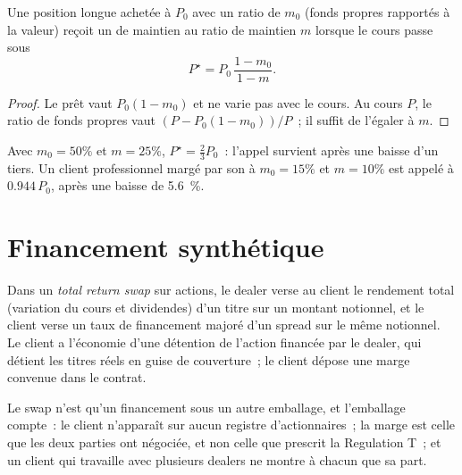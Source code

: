 \begin{proposition}\label{prop:m1:financing:call}
Une position longue achetée à $P_0$ avec un ratio de  $m_0$ (fonds propres
rapportés à la valeur) reçoit un  de maintien au ratio de maintien $m$ lorsque le cours
passe sous
\[
P^\star = P_0\,\frac{1-m_0}{1-m}.
\]
\end{proposition}
\begin{proof}
Le prêt vaut $P_0(1-m_0)$ et ne varie pas avec le cours. Au cours $P$,
le ratio de fonds propres vaut $(P - P_0(1-m_0))/P$~; il suffit de l'égaler à $m$.
\end{proof}

\begin{example}\label{ex:m1:financing:regt}
Avec $m_0 = 50\%$ et $m = 25\%$, $P^\star = \tfrac23 P_0$~: l'appel survient après
une baisse d'un tiers. Un client professionnel margé par son 
à $m_0 = 15\%$ et $m = 10\%$ est appelé à $0.944\,P_0$, après une baisse de
5.6~\%.
\end{example}

\section{Financement synthétique}

\begin{definition}\label{def:m1:financing:trs}
Dans un \emph{total return swap} sur actions, le dealer
verse au client le rendement total (variation du cours et dividendes) d'un titre sur
un montant notionnel, et le client verse un taux de financement majoré d'un spread sur le
même notionnel. Le client a l'économie d'une détention de l'action financée par
le dealer, qui détient les titres réels en guise de couverture~; le client dépose
une marge convenue dans le contrat.
\end{definition}

Le swap n'est qu'un financement sous un autre emballage, et l'emballage compte~: le
client n'apparaît sur aucun registre d'actionnaires~; la marge est celle que les deux
parties ont négociée, et non celle que prescrit la Regulation T~; et un client
qui travaille avec plusieurs dealers ne montre à chacun que sa part.

